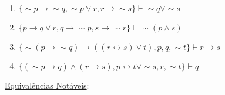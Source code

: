 \documentclass[12pt, a4paper,final]{article}
\begin{document}
\begin{enumerate}
\begin{enumerate}
            \item $ \{ \sim p \rightarrow \sim q, \sim p \vee r, r \rightarrow \sim s \} \vdash \sim q \vee \sim s $ %
            
            \item $\{ p \rightarrow q \vee r, q \rightarrow \sim p, s \rightarrow \sim r \} \vdash \sim (p \wedge s) $ %
            
            \item $\{ \sim (p \rightarrow \sim q) \rightarrow ((r \leftrightarrow s) \vee t), p, q, \sim t \} \vdash r \rightarrow s$ %
            
            \item $\{ (\sim p \rightarrow q) \wedge (r \rightarrow s), p \leftrightarrow t \vee \sim s, r, \sim t \} \vdash q$ %
            
        \end{enumerate}
               
    \end{enumerate}




\newpage

    \underline{{\Large Equivalências Notáveis}}:
    
\end{document}
